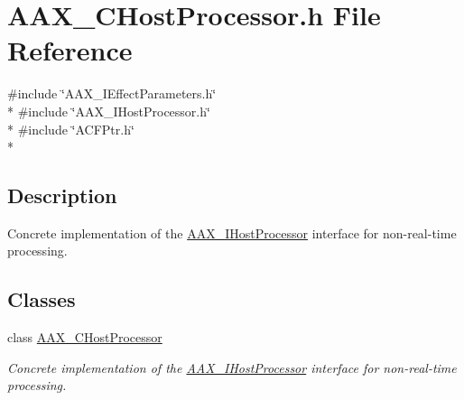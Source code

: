 \hypertarget{a00173}{}\section{A\+A\+X\+\_\+\+C\+Host\+Processor.\+h File Reference}
\label{a00173}
{\ttfamily \#include \char`\"{}A\+A\+X\+\_\+\+I\+Effect\+Parameters.\+h\char`\"{}}\\*
{\ttfamily \#include \char`\"{}A\+A\+X\+\_\+\+I\+Host\+Processor.\+h\char`\"{}}\\*
{\ttfamily \#include \char`\"{}A\+C\+F\+Ptr.\+h\char`\"{}}\\*


\subsection{Description}
Concrete implementation of the \hyperlink{a00101}{A\+A\+X\+\_\+\+I\+Host\+Processor} interface for non-\/real-\/time processing. 

\subsection*{Classes}
\begin{DoxyCompactItemize}
\item 
class \hyperlink{a00020}{A\+A\+X\+\_\+\+C\+Host\+Processor}
\begin{DoxyCompactList}\small\item\em Concrete implementation of the \hyperlink{a00101}{A\+A\+X\+\_\+\+I\+Host\+Processor} interface for non-\/real-\/time processing. \end{DoxyCompactList}\end{DoxyCompactItemize}
